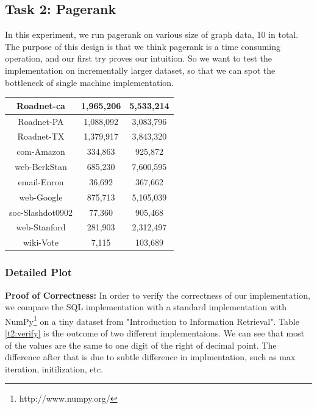 \subsection{Task 2: Pagerank}
In this experiment, we run pagerank on various size of graph data, 10 in total. The purpose of this design is that we think pagerank is a time consuming operation, and our first try proves our intuition. So we want to test the implementation on incrementally larger dataset, so that we can spot the bottleneck of single machine implementation. 

\begin{center}
\begin{tabular}{| c | c | c |}
    \hline
    Roadnet-ca & 1,965,206 & 5,533,214 \\ \hline
    Roadnet-PA & 1,088,092 & 3,083,796 \\ \hline
    Roadnet-TX & 1,379,917 & 3,843,320 \\ \hline
    com-Amazon & 334,863 & 925,872 \\ \hline
    web-BerkStan & 685,230 & 7,600,595 \\ \hline
    email-Enron & 36,692 & 367,662 \\ \hline
    web-Google & 875,713 & 5,105,039 \\ \hline
    soc-Slashdot0902 & 77,360 & 905,468 \\ \hline
    web-Stanford & 281,903 & 2,312,497 \\ \hline
    wiki-Vote & 7,115 & 103,689 \\ \hline
\end{tabular}
\end{center}

\subsubsection{Detailed Plot}
{\bf Proof of Correctness: } In order to verify the correctness of our implementation, we compare the SQL implementation with a standard implementation with NumPy\footnote{http://www.numpy.org/} on a tiny dataset from "Introduction to Information Retrieval". Table \ref{t2:verify} is the outcome of two different implementaions. We can see that most of the values are the same to one digit of the right of decimal point. The difference after that is due to subtle difference in implmentation, such as max iteration, initilization, etc.

